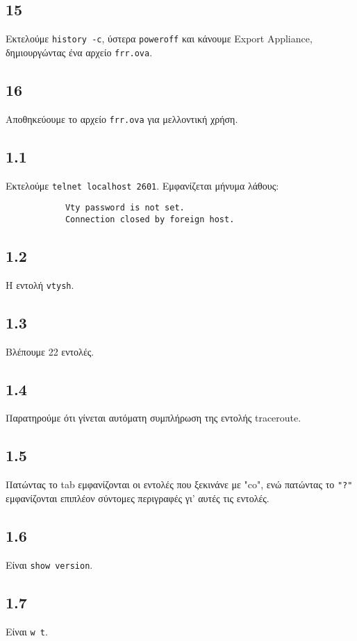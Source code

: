 \documentclass[a4paper, 12pt]{article}
\begin{document}
	\subsection*{15}
		Εκτελούμε \verb|history -c|, ύστερα \verb|poweroff| και κάνουμε Export Appliance, δημιουργώντας ένα αρχείο \verb|frr.ova|.
	
	\subsection*{16}
		Αποθηκεύουμε το αρχείο \verb|frr.ova| για μελλοντική χρήση.

	\subsection*{1.1}
		Εκτελούμε \verb|telnet localhost 2601|. Εμφανίζεται μήνυμα λάθους:
		
		\begin{verbatim}
			Vty password is not set.
			Connection closed by foreign host.
		\end{verbatim}

	\subsection*{1.2}
		Η εντολή \verb|vtysh|.

	\subsection*{1.3}
		Βλέπουμε 22 εντολές.

	\subsection*{1.4}
		Παρατηρούμε ότι γίνεται αυτόματη συμπλήρωση της εντολής traceroute.

	\subsection*{1.5}
		Πατώντας το tab εμφανίζονται οι εντολές που ξεκινάνε με "co", ενώ πατώντας το \verb|"?"| εμφανίζονται επιπλέον σύντομες περιγραφές γι' αυτές τις εντολές.

	\subsection*{1.6}
		Είναι \verb|show version|.

	\subsection*{1.7}
		Είναι \verb|w t|.
\end{document}
